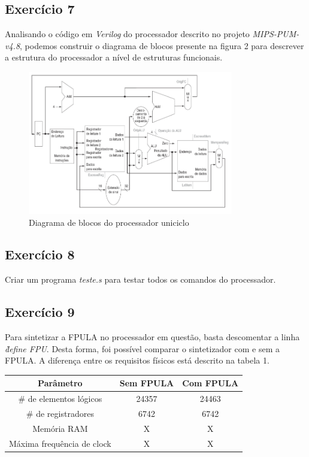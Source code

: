 \documentclass[12pt, a4paper, twoside]{article}
\begin{document}
\subsection{Exercício 7}

Analisando o código em \textit{Verilog} do processador descrito no projeto \textit{MIPS-PUM-v4.8}, podemos construir o diagrama de blocos presente na figura 2 para descrever a estrutura do processador a nível de estruturas funcionais.

\begin{figure}
    \centering
    \includegraphics[width=0.8\textwidth]{./figs/q7.png}
    \caption{Diagrama de blocos do processador uniciclo}
\end{figure}


\subsection{Exercício 8}

Criar um programa \textit{teste.s} para testar todos os comandos do processador.

\subsection{Exercício 9}

Para sintetizar a FPULA no processador em questão, basta descomentar a linha \textit{\` define FPU}. Desta forma, foi possível comparar o sintetizador com e sem a FPULA. A diferença entre os requisitos físicos está descrito na tabela 1.

\begin{center}
  \begin{tabular}{ | c | c | c | }
    \hline
    Parâmetro                  & Sem FPULA & Com FPULA \\ \hline \hline
    \# de elementos lógicos    & 24357     & 24463     \\ \hline
    \# de registradores        & 6742      & 6742      \\ \hline
    Memória RAM                & X         & X         \\ \hline
    Máxima frequência de clock & X         & X         \\ \hline
  \end{tabular}
\end{center}
\end{document}
